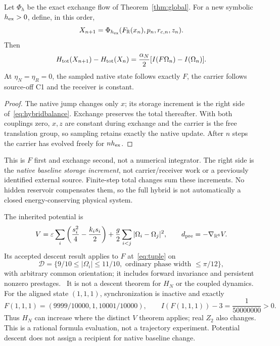 \begin{proposition}\label{prop:hybrid}
Let $\Phi_h$ be the exact exchange flow of Theorem~\ref{thm:global}. For a new symbolic $h_{\rm ex}>0$, define, in this order,
\begin{equation}\label{eq:hybrid}
 X_{n+1}=\Phi_{h_{\rm ex}}(F_\mathbb R(x_n),p_n,r_{c,n},z_n).
\end{equation}
Then
\begin{equation}\label{eq:hybridbalance}
 H_{\rm tot}(X_{n+1})-H_{\rm tot}(X_n)
 =\frac{\alpha_N}{2}[I(F\Omega_n)-I(\Omega_n)].
\end{equation}
At $\eta_N=\eta_R=0$, the sampled native state follows exactly $F$, the carrier follows source-off C1 and the receiver is constant.
\end{proposition}
\begin{proof}
The native jump changes only $x$; its storage increment is the right side of~\eqref{eq:hybridbalance}. Exchange preserves the total thereafter. With both couplings zero, $x,z$ are constant during exchange and the carrier is the free translation group, so sampling retains exactly the native update. After $n$ steps the carrier has evolved freely for $nh_{\rm ex}$.
\end{proof}
This is $F$ first and exchange second, not a numerical integrator. The right side is the \emph{native baseline storage increment}, not carrier/receiver work or a previously identified external source. Finite-step total changes sum these increments. No hidden reservoir compensates them, so the full hybrid is not automatically a closed energy-conserving physical system.

The inherited potential is
\begin{equation}\label{eq:potential}
 V=\varepsilon\sum_i\left(\frac{s_i^2}{4}-\frac{k_i s_i}{2}\right)
 +\frac g2\sum_{i<j}|\Omega_i-\Omega_j|^2,\qquad d_{\rm pre}=-\nabla_{\mathbb R^6}V.
\end{equation}
Its accepted descent result applies to $F$ at~\eqref{eq:tuple} on
\begin{equation}\label{eq:domain}
 \mathcal D=\{9/10\le|\Omega_i|\le11/10,
 \text{ ordinary phase width }\le\pi/12\},
\end{equation}
with arbitrary common orientation; it includes forward invariance and persistent nonzero prestages.~\cite{intensity}
It is not a descent theorem for $H_N$ or the coupled dynamics. For the aligned state $(1,1,1)$, synchronization is inactive and exactly
\begin{equation}\label{eq:positivebaseline}
 F(1,1,1)=(9999/10000,1,10001/10000),\qquad
 I(F(1,1,1))-3=\frac1{50000000}>0.
\end{equation}
Thus $H_N$ can increase where the distinct $V$ theorem applies; real $Z_2$ also changes. This is a rational formula evaluation, not a trajectory experiment. Potential descent does not assign a recipient for native baseline change.

